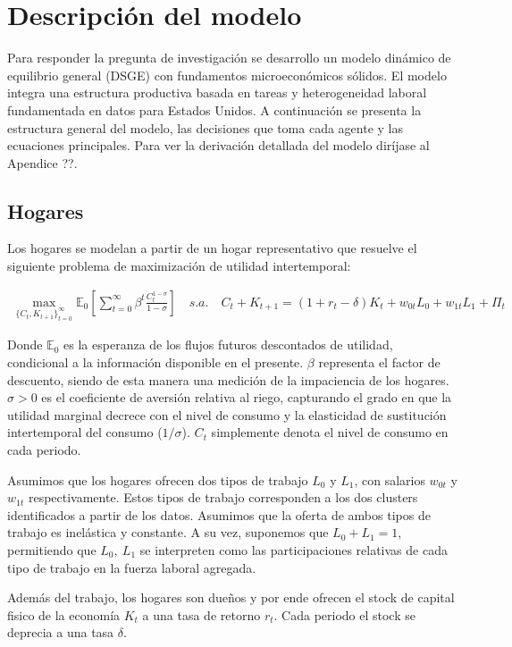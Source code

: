 \documentclass{article}
\theoremstyle{remark}
\theoremstyle{definition}
\begin{document}

\section{Descripci\'on del modelo}
Para responder la pregunta de investigaci\'on se desarrollo un modelo din\'amico de equilibrio general (DSGE) con fundamentos microecon\'omicos s\'olidos. El modelo integra una estructura productiva basada en tareas y heterogeneidad laboral fundamentada en datos para Estados Unidos. A continuaci\'on se presenta la estructura general del modelo, las decisiones que toma cada agente y las ecuaciones principales. Para ver la derivaci\'on detallada del modelo diríjase al Apendice ??.

\subsection{Hogares}
Los hogares se modelan a partir de un hogar representativo que resuelve el siguiente problema de maximizaci\'on de utilidad intertemporal:

\begin{align*}
    \max_{\{C_t, K_{t+1}\}_{t=0}^{\infty}} \mathbb{E}_0 \left[ \sum_{t=0}^{\infty} \beta^t \frac{C_t^{1-\sigma}}{1-\sigma} \right] \quad s.a. \quad C_t + K_{t+1} = (1+r_t-\delta)K_t + w_{0t}L_0 + w_{1t}L_1 + \Pi_t
\end{align*}

Donde $\mathbb{E}_0$ es la esperanza de los flujos futuros descontados de utilidad, condicional a la informaci\'on disponible en el presente. $\beta$ representa el factor de descuento, siendo de esta manera una medici\'on de la impaciencia de los hogares. $\sigma > 0$ es el coeficiente de aversi\'on relativa al riego, capturando el grado en que la utilidad marginal decrece con el nivel de consumo y la elasticidad de sustituci\'on intertemporal del consumo ($1/\sigma$). $C_t$ simplemente denota el nivel de consumo en cada periodo.

Asumimos que los hogares ofrecen dos tipos de trabajo $L_0$ y $L_1$, con salarios $w_{0t}$ y $w_{1t}$ respectivamente. Estos tipos de trabajo corresponden a los dos clusters identificados a partir de los datos. Asumimos que la oferta de ambos tipos de trabajo es inel\'astica y constante. A su vez, suponemos que $L_0 +L_1 =1$, permitiendo que $L_0, \ L_1$ se interpreten como las participaciones relativas de cada tipo de trabajo en la fuerza laboral agregada.

Adem\'as del trabajo, los hogares son dueños y por ende ofrecen el stock de capital fisico de la econom\'ia $K_t$ a una tasa de retorno $r_t$. Cada periodo el stock se deprecia a una tasa $\delta$.
\end{document}
